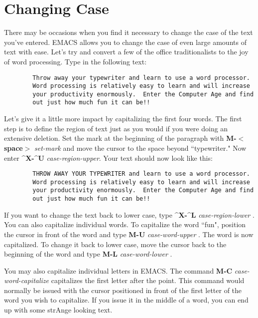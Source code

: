 \section{Changing Case}

There may be occasions when you find it necessary to change the case of
the text you've entered.  EMACS allows you to change the case of even
large amounts of text with ease.  Let's try and convert a few of the
office traditionalists to the joy of word processing.  Type in the
following text:

\begin{verbatim}
        Throw away your typewriter and learn to use a word processor.
        Word processing is relatively easy to learn and will increase
        your productivity enormously.  Enter the Computer Age and find
        out just how much fun it can be!!
\end{verbatim}

Let's give it a little more impact by capitalizing the first four
words.  The first step is to define the region of text just as you
would if you were doing an extensive deletion.  Set the mark at the
beginning of the paragraph with {\bf{}M-$<${}space$>${}}
{\it{}set-mark} and move the cursor to the space beyond ``typewriter."
Now enter {\bf{}\^{}X-\^{}U} {\it{}case-region-upper}.  Your text
should now look like this:

\begin{verbatim}
        THROW AWAY YOUR TYPEWRITER and learn to use a word processor.
        Word processing is relatively easy to learn and will increase
        your productivity enormously.  Enter the Computer Age and find
        out just how much fun it can be!!
\end{verbatim}

If you want to change the text back to lower case, type {\bf{}\^{}X-\^{}L}
{\it{}case-region-lower} .  You can also
capitalize individual words.  To capitalize the word ``fun", position the
cursor in front of the word and type {\bf{}M-U} {\it{}case-word-upper}
.  The word is now capitalized.  To change it
back to lower case, move the cursor back to the beginning of the word
and type {\bf{}M-L} {\it{}case-word-lower} .

You may also capitalize individual letters in EMACS.  The command
{\bf{}M-C} {\it{}case-word-capitalize} 
capitalizes the first letter after the point.  This command would
normally be issued with the cursor positioned in front of the first
letter of the word you wish to capitalize.  If you issue it in the
middle of a word, you can end up with some strAnge looking text.

